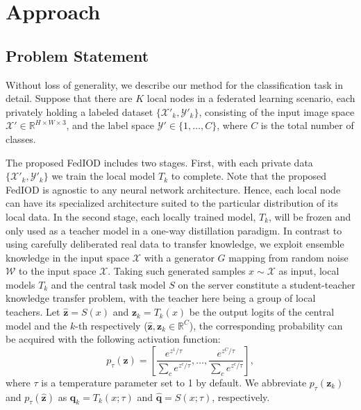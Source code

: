 \documentclass[letterpaper]{article} %
\makeatletter
\DeclareRobustCommand\onedot{\futurelet\@let@token\@onedot}
\def\@onedot{\ifx\@let@token.\else.\null\fi\xspace}
\def\ie{\emph{i.e}\onedot} \def\Ie{\emph{I.e}\onedot}
\newcommand{\domw}{\mathcal{W}}
\newcommand{\domx}{\mathcal{X}}
\newcommand{\domy}{\mathcal{Y}}
\makeatother
\begin{document}
\section{Approach}
\subsection{Problem Statement}
Without loss of generality, we describe our method for the classification task in detail. 
Suppose that there are $K$ local nodes in a federated learning scenario, each privately holding a labeled dataset $ \{\domx'_k, \domy'_k \}$, consisting of the input image space $\domx' \in \mathbb{R}^{H \times W \times 3}$, and the label space $\domy' \in \{1, \dots, C \}$, where $C$ is the total number of classes. 

The proposed FedIOD includes two stages. First, with each private data $\{\domx'_k, \domy'_k \}$ we train the local model $T_k$ to complete. Note that the proposed FedIOD is agnostic to any neural network architecture. Hence, each local node can have its specialized architecture suited to the particular distribution of its local data. In the second stage, each locally trained model, $T_k$, will be frozen and only used as a teacher model in a one-way distillation paradigm. In contrast to \cite{gong2022federated, li2021practical} using carefully deliberated real data to transfer knowledge, we exploit ensemble knowledge in the input space $\mathcal{X}$ with a generator $G$ mapping from random noise $\domw$ to the input space $\mathcal{X}$. Taking such generated samples $x \sim \mathcal{X}$ as input, local models $T_k$ and the central task model $S$ on the server constitute a student-teacher knowledge transfer problem, with the teacher here being a group of local teachers. 
Let $\hat{\bm{z}}=S(x) $  and $\bm{z}_k=T_k(x)$ be the output logits of the central model and the $k$-th respectively ($\hat{\bm{z}}, \bm{z}_k \in \mathbb{R}^C$), the corresponding probability can be acquired with the following activation function:
\begin{equation}
\label{eq:softmax}
   p_\tau(\bm{z})= \left[\frac{e^{z^1/\tau}}{\sum_c{e^{ z^c/\tau}}}, \dots, \frac{e^{z^C/\tau}}{\sum_c{e^{ z^c/\tau}}}\right],
\end{equation}
where $\tau$ is a temperature parameter set to 1 by default. We abbreviate $p_\tau(\bm{z}_k)$ and $p_\tau(\hat{\bm{z}})$ as $\bm{q}_k = T_k (x; \tau) $ and $\hat{\bm{q}} = S(x; \tau)$, respectively. 
\end{document}
